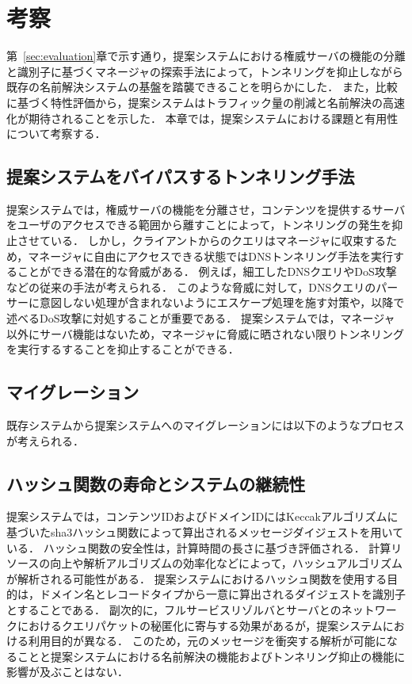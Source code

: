 \section{考察}
第~\ref{sec:evaluation}章で示す通り，提案システムにおける権威サーバの機能の分離と識別子に基づくマネージャの探索手法によって，トンネリングを抑止しながら既存の名前解決システムの基盤を踏襲できることを明らかにした．
また，比較に基づく特性評価から，提案システムはトラフィック量の削減と名前解決の高速化が期待されることを示した．
本章では，提案システムにおける課題と有用性について考察する．

\subsection{提案システムをバイパスするトンネリング手法}
提案システムでは，権威サーバの機能を分離させ，コンテンツを提供するサーバをユーザのアクセスできる範囲から離すことによって，トンネリングの発生を抑止させている．
しかし，クライアントからのクエリはマネージャに収束するため，マネージャに自由にアクセスできる状態ではDNSトンネリング手法を実行することができる潜在的な脅威がある．
例えば，細工したDNSクエリやDoS攻撃などの従来の手法が考えられる．
このような脅威に対して，DNSクエリのパーサーに意図しない処理が含まれないようにエスケープ処理を施す対策や，以降で述べるDoS攻撃に対処することが重要である．
提案システムでは，マネージャ以外にサーバ機能はないため，マネージャに脅威に晒されない限りトンネリングを実行するすることを抑止することができる．

\subsection{マイグレーション}
既存システムから提案システムへのマイグレーションには以下のようなプロセスが考えられる．



\subsection{ハッシュ関数の寿命とシステムの継続性}
提案システムでは，コンテンツIDおよびドメインIDにはKeccakアルゴリズムに基づいたsha3ハッシュ関数によって算出されるメッセージダイジェストを用いている．
ハッシュ関数の安全性は，計算時間の長さに基づき評価される．
計算リソースの向上や解析アルゴリズムの効率化などによって，ハッシュアルゴリズムが解析される可能性がある．
提案システムにおけるハッシュ関数を使用する目的は，ドメイン名とレコードタイプから一意に算出されるダイジェストを識別子とすることである．
副次的に，フルサービスリゾルバとサーバとのネットワークにおけるクエリパケットの秘匿化に寄与する効果があるが，提案システムにおける利用目的が異なる．
このため，元のメッセージを衝突する解析が可能になることと提案システムにおける名前解決の機能およびトンネリング抑止の機能に影響が及ぶことはない．

